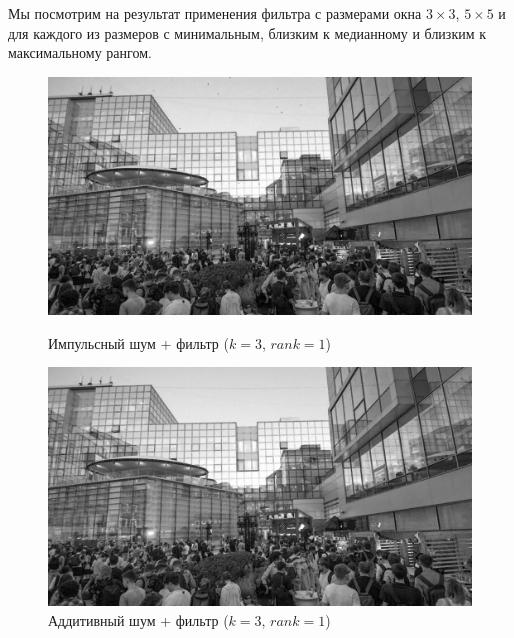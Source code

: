 \documentclass[a4paper]{article}
\begin{document}
Мы посмотрим на результат применения фильтра с размерами окна $3\times3$, $5\times5$ и для каждого из размеров с минимальным, близким к медианному и близким к максимальному рангом.
\begin{figure}[H]
    \begin{minipage}{0.49\textwidth}
        \centering \includegraphics[width=\textwidth]{images/3_nonlinear_filters/impulse - rang (k=3, rank=1).jpg}
        \caption{Импульсный шум + фильтр ($k = 3$, $rank = 1$)}
    \end{minipage}\hfill
    \begin{minipage}{0.49\textwidth}
        \centering \includegraphics[width=\textwidth]{images/3_nonlinear_filters/additive - rang (k=3, rank=1).jpg}
        \caption{Аддитивный шум + фильтр ($k = 3$, $rank = 1$)}
    \end{minipage}
\end{figure}
\end{document}
